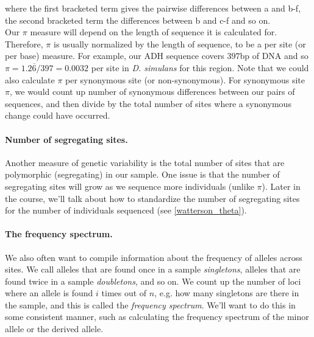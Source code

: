 where the first bracketed term gives the pairwise differences between a and
b-f, the second bracketed term the differences between b and c-f and so on. \\

Our $\pi$ measure will depend on the length of sequence it is calculated for.
Therefore, $\pi$ is usually normalized by the length of sequence, to be a per
site (or per base) measure. For example, our ADH sequence covers $397$bp of DNA
and so $\pi = 1.2\overline{6}/397=0.0032$ per site in \textit{D. simulans} for
this region. Note that we could also calculate $\pi$ per synonymous site (or
non-synonymous). For synonymous site $\pi$, we would count up number of
synonymous differences between our pairs of sequences, and then divide by the
total number of sites where a synonymous change could have occurred.


\paragraph{Number of segregating sites.} Another measure of genetic variability is the total number of sites
that are polymorphic (segregating) in our sample. One issue is that
the number of segregating sites will grow as we sequence more
individuals (unlike $\pi$). Later in the course, we'll talk about how to standardize the
number of segregating sites for the number of individuals sequenced (see \eqn \eqref{watterson_theta}).

\paragraph{The frequency spectrum.} We also often want to compile information
about the frequency of alleles across sites.  We call alleles that are found
once in a sample \emph{singletons}, alleles that are found twice in a sample
\emph{doubletons}, and so on. We count up the number of loci where an allele is
found $i$ times out of $n$, e.g. how many singletons are there in the sample,
and this is called the \emph{frequency spectrum}. We'll want to do this in some
consistent manner, such as calculating the frequency spectrum of the minor
allele or the derived allele.

